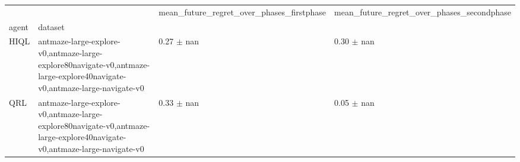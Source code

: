 \begin{tabular}{llll}
\toprule
 &  & mean_future_regret_over_phases_firstphase & mean_future_regret_over_phases_secondphase \\
agent & dataset &  &  \\
\midrule
HIQL & antmaze-large-explore-v0,antmaze-large-explore80navigate-v0,antmaze-large-explore40navigate-v0,antmaze-large-navigate-v0 & 0.27 $\pm$ nan & 0.30 $\pm$ nan \\
\cline{1-4}
QRL & antmaze-large-explore-v0,antmaze-large-explore80navigate-v0,antmaze-large-explore40navigate-v0,antmaze-large-navigate-v0 & 0.33 $\pm$ nan & 0.05 $\pm$ nan \\
\cline{1-4}
\bottomrule
\end{tabular}
